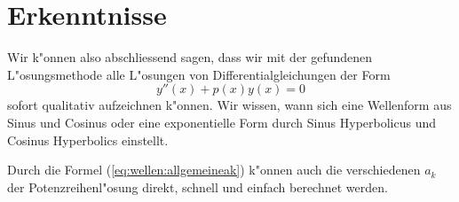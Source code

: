 \section{Erkenntnisse}

Wir k"onnen also abschliessend sagen, dass wir mit der gefundenen 
L"osungsmethode alle L"osungen von Differentialgleichungen der Form 
\begin{equation*}
	y''(x)+p(x)y(x) = 0
\end{equation*}
sofort qualitativ aufzeichnen k"onnen. Wir wissen, wann sich eine Wellenform 
aus Sinus und Cosinus oder eine exponentielle Form durch Sinus Hyperbolicus und 
Cosinus Hyperbolics einstellt.

Durch die Formel (\ref{eq:wellen:allgemeineak}) k"onnen auch die verschiedenen 
$a_k$ der Potenzreihenl"osung direkt, schnell und einfach berechnet werden.